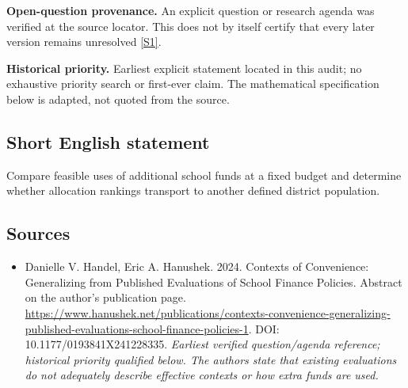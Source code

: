 \documentclass[11pt]{article}
\newcommand{\sref}[2]{\hyperlink{source:#1:#2}{[S#2]}}
\begin{document}
\par\textbf{Open-question provenance.} An explicit question or research agenda was verified at the source locator. This does not by itself certify that every later version remains unresolved \sref{30007734}{1}.

\par\textbf{Historical priority.} Earliest explicit statement located in this audit; no exhaustive priority search or first-ever claim. The mathematical specification below is adapted, not quoted from the source.

\subsection{Short English statement}
Compare feasible uses of additional school funds at a fixed budget and determine whether allocation rankings transport to another defined district population.

\subsection{Sources}
\begin{itemize}\raggedright
\item[\textnormal{[S1]}]\hypertarget{source:30007734:1}{} Danielle V. Handel, Eric A. Hanushek. 2024. Contexts of Convenience: Generalizing from Published Evaluations of School Finance Policies. Abstract on the author’s publication page.
\url{https://www.hanushek.net/publications/contexts-convenience-generalizing-published-evaluations-school-finance-policies-1}.
DOI: 10.1177/0193841X241228335.
{\small\textit{Earliest verified question/agenda reference; historical priority qualified below. The authors state that existing evaluations do not adequately describe effective contexts or how extra funds are used.}}
\end{itemize}
\end{document}
